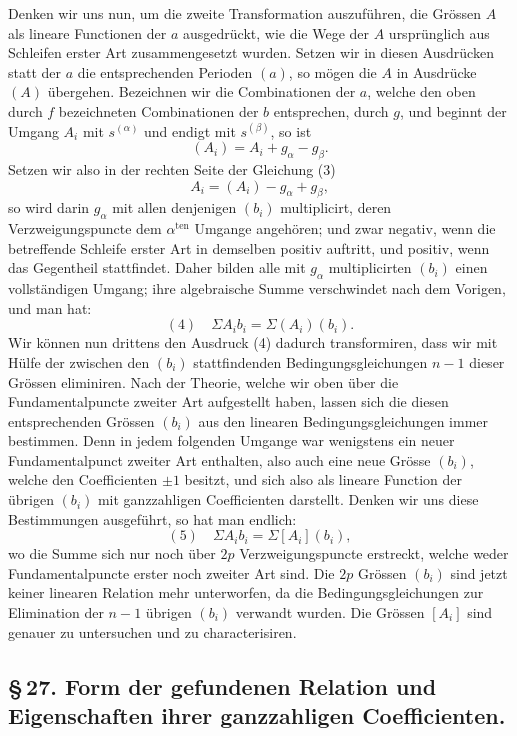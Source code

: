 \documentclass[10pt]{article}
\begin{document}
Denken wir uns nun, um die zweite Transformation auszuführen, die Grössen \(A\) als lineare Functionen der \(a\) ausgedrückt, wie die Wege der \(A\) ursprünglich aus Schleifen erster Art zusammengesetzt wurden. Setzen wir in diesen Ausdrücken statt der \(a\) die entsprechenden Perioden \((a)\), so mögen die \(A\) in Ausdrücke \((A)\) übergehen. Bezeichnen wir die Combinationen der \(a\), welche den oben durch \(f\) bezeichneten Combinationen der \(b\) entsprechen, durch \(g\), und beginnt der Umgang \(A_i\) mit \(s^{(\alpha)}\) und endigt mit \(s^{(\beta)}\), so ist
\[
(A_i)=A_i+g_{\alpha}-g_{\beta}.
\]
Setzen wir also in der rechten Seite der Gleichung (3)
\[
A_i=(A_i)-g_{\alpha}+g_{\beta},
\]
so wird darin \(g_{\alpha}\) mit allen denjenigen \((b_i)\) multiplicirt, deren Verzweigungspuncte dem \(\alpha^{\text{ten}}\) Umgange angehören; und zwar negativ, wenn die betreffende Schleife erster Art in demselben positiv auftritt, und positiv, wenn das Gegentheil stattfindet. Daher bilden alle mit \(g_{\alpha}\) multiplicirten \((b_i)\) einen vollständigen Umgang; ihre algebraische Summe verschwindet nach dem Vorigen, und man hat:
\[
(4)\quad \Sigma A_i b_i=\Sigma(A_i)(b_i).
\]
Wir können nun drittens den Ausdruck (4) dadurch transformiren, dass wir mit Hülfe der zwischen den \((b_i)\) stattfindenden Bedingungsgleichungen \(n-1\) dieser Grössen eliminiren. Nach der Theorie, welche wir oben über die Fundamentalpuncte zweiter Art aufgestellt haben, lassen sich die diesen entsprechenden Grössen \((b_i)\) aus den linearen Bedingungsgleichungen immer bestimmen. Denn in jedem folgenden Umgange war wenigstens ein neuer Fundamentalpunct zweiter Art enthalten, also auch eine neue Grösse \((b_i)\), welche den Coefficienten \(\pm1\) besitzt, und sich also als lineare Function der übrigen \((b_i)\) mit ganzzahligen Coefficienten darstellt. Denken wir uns diese Bestimmungen ausgeführt, so hat man endlich:
\[
(5)\quad \Sigma A_i b_i=\Sigma[A_i](b_i),
\]
wo die Summe sich nur noch über \(2p\) Verzweigungspuncte erstreckt, welche weder Fundamentalpuncte erster noch zweiter Art sind. Die \(2p\) Grössen \((b_i)\) sind jetzt keiner linearen Relation mehr unterworfen, da die Bedingungsgleichungen zur Elimination der \(n-1\) übrigen \((b_i)\) verwandt wurden. Die Grössen \([A_i]\) sind genauer zu untersuchen und zu characterisiren.

\subsection*{\S\,27. Form der gefundenen Relation und Eigenschaften ihrer ganzzahligen Coefficienten.}
\end{document}
